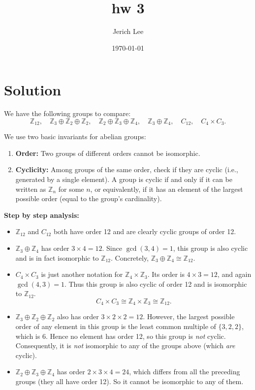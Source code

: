 \documentclass[12pt]{article}
\title{hw 3}
\author{Jerich Lee}
\date{\today}
\theoremstyle{definition} %
\theoremstyle{plain} %
\begin{document}
\maketitle
\section*{Solution}

We have the following groups to compare:
\[
\mathbb{Z}_{12}, \quad \mathbb{Z}_{3} \oplus \mathbb{Z}_{2} \oplus \mathbb{Z}_{2}, \quad 
\mathbb{Z}_{2} \oplus \mathbb{Z}_{3} \oplus \mathbb{Z}_{4}, \quad
\mathbb{Z}_{3} \oplus \mathbb{Z}_{4}, \quad
C_{12}, \quad
C_{4} \times C_{3}.
\]

We use two basic invariants for abelian groups:
\begin{enumerate}
    \item \textbf{Order:} Two groups of different orders cannot be isomorphic.
    \item \textbf{Cyclicity:} Among groups of the same order, check if they are cyclic 
    (i.e., generated by a single element). A group is cyclic if and only if it 
    can be written as $\mathbb{Z}_n$ for some $n$, or equivalently, if it has 
    an element of the largest possible order (equal to the group’s cardinality).
\end{enumerate}

\noindent \textbf{Step by step analysis:}
\begin{itemize}
    \item \(\mathbb{Z}_{12}\) and \(C_{12}\) both have order 12 and are clearly cyclic groups of order 12.
    \item \(\mathbb{Z}_{3} \oplus \mathbb{Z}_{4}\) has order \(3 \times 4 = 12\). Since 
    \(\gcd(3,4) = 1\), this group is also cyclic and is in fact isomorphic to 
    \(\mathbb{Z}_{12}\). Concretely, \(\mathbb{Z}_{3}\oplus \mathbb{Z}_{4} \cong \mathbb{Z}_{12}\).
    \item \(C_{4} \times C_{3}\) is just another notation for \(\mathbb{Z}_{4} \times \mathbb{Z}_{3}\).
    Its order is \(4 \times 3 = 12\), and again \(\gcd(4,3) = 1\). Thus this group 
    is also cyclic of order 12 and is isomorphic to \(\mathbb{Z}_{12}\).
    \[
      C_{4} \times C_{3} \cong \mathbb{Z}_{4} \times \mathbb{Z}_{3} \cong \mathbb{Z}_{12}.
    \]

    \item \(\mathbb{Z}_{3} \oplus \mathbb{Z}_{2} \oplus \mathbb{Z}_{2}\) also has order 
    \(3 \times 2 \times 2 = 12\). However, the largest possible order of any 
    element in this group is the least common multiple of \(\{3,2,2\}\), which 
    is 6. Hence no element has order 12, so this group is \emph{not} cyclic. 
    Consequently, it is \emph{not} isomorphic to any of the groups above (which \emph{are} cyclic).

    \item \(\mathbb{Z}_{2} \oplus \mathbb{Z}_{3} \oplus \mathbb{Z}_{4}\) has order 
    \(2 \times 3 \times 4 = 24\), which differs from all the preceding groups 
    (they all have order 12). So it cannot be isomorphic to any of them.
\end{itemize}
\end{document}
